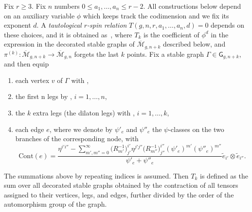 \documentclass[10pt,a4paper]{amsart}
\def\oM{\overline{\mathcal{M}}}
\numberwithin{equation}{section}
\begin{document}
Fix $r\geq 3$. Fix $n$ numbers $0\leq a_1,\dots,a_n\leq r-2$. All constructions below depend on an auxiliary variable $\phi$ which keeps track
the codimension and we fix its exponent $d$. A {\em tautological $r$-spin relation} $T(g,n,r,a_1,\dots,a_n,d)=0$ depends on these choices, and it is obtained as~, where $T_k$ is the coefficient of $\phi^d$ in the expression in the decorated stable graphs of $\oM_{g,n+k}$ described below, and $\pi^{(k)}\colon \oM_{g,n+k}\to \oM_{g,n}$ forgets the last $k$ points.
Fix a stable graph $\Gamma \in \mathsf{G}_{g,n+k}$, and then equip
\begin{enumerate}\itemsep=0pt
\item[(i)] each vertex $v$ of $\Gamma$ with ,

\item[(ii)]the first n legs by , $i=1,\dots,n$,

\item[(iii)]the $k$ extra legs (the dilaton legs) with , $i=1,\dots,k$,

\item[(iv)]each edge $e$, where we denote by $\psi'_e$ and $\psi''_e$ the $\psi$-classes on the two branches of the corresponding node, with
\[
\mathrm{Cont}(e)= \frac{\eta^{i'i''}-\sum_{m',m''=0}^\infty \big(R^{-1}_{m'}\big)_{j'}^{i'} \eta^{j'j''} \big(R^{-1}_{m''}\big)_{j''}^{i''} (\psi'_e)^{m'}(\psi''_e)^{m''} }{\psi'_e+\psi''_e} \widetilde{e}_{i'}\otimes \widetilde{e}_{i''}.
\]
\end{enumerate}
The summations above by repeating indices is assumed.
Then $T_k$ is defined as the sum over all decorated stable graphs obtained by the contraction of all tensors assigned to their vertices, legs, and edges, further divided by the order of the automorphism group of the graph.
\end{document}
